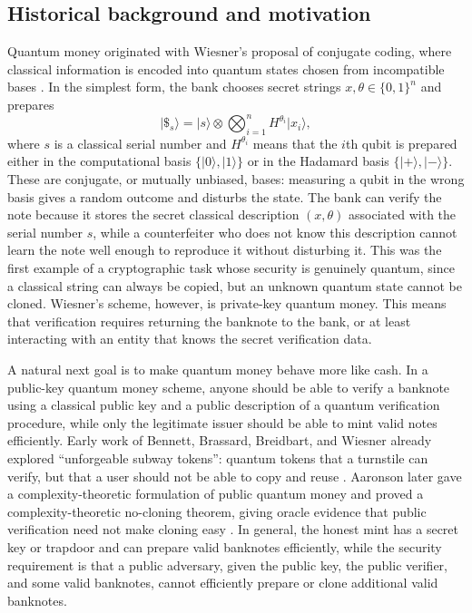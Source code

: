 \documentclass[12pt]{article}
\begin{document}
\subsection{Historical background and motivation}
Quantum money originated with Wiesner's proposal of conjugate coding, where classical information is encoded into quantum states chosen from incompatible bases \cite{wiesnerConjugateCoding1983}.
In the simplest form, the bank chooses secret strings $x,\theta \in \{0,1\}^n$ and prepares
\[
|\$_s\rangle = |s\rangle \otimes \bigotimes_{i=1}^n H^{\theta_i}|x_i\rangle,
\]
where $s$ is a classical serial number and $H^{\theta_i}$ means that the $i$th qubit is prepared either in the computational basis $\{|0\rangle,|1\rangle\}$ or in the Hadamard basis $\{|+\rangle,|-\rangle\}$.
These are conjugate, or mutually unbiased, bases: measuring a qubit in the wrong basis gives a random outcome and disturbs the state.
The bank can verify the note because it stores the secret classical description $(x,\theta)$ associated with the serial number $s$, while a counterfeiter who does not know this description cannot learn the note well enough to reproduce it without disturbing it.
This was the first example of a cryptographic task whose security is genuinely quantum, since a classical string can always be copied, but an unknown quantum state cannot be cloned.
Wiesner's scheme, however, is private-key quantum money.
This means that verification requires returning the banknote to the bank, or at least interacting with an entity that knows the secret verification data.

A natural next goal is to make quantum money behave more like cash.
In a public-key quantum money scheme, anyone should be able to verify a banknote using a classical public key and a public description of a quantum verification procedure, while only the legitimate issuer should be able to mint valid notes efficiently.
Early work of Bennett, Brassard, Breidbart, and Wiesner already explored ``unforgeable subway tokens'': quantum tokens that a turnstile can verify, but that a user should not be able to copy and reuse \cite{bennettQuantumCryptographyUnforgeable1982}.
Aaronson later gave a complexity-theoretic formulation of public quantum money and proved a complexity-theoretic no-cloning theorem, giving oracle evidence that public verification need not make cloning easy \cite{aaronsonQuantumCopyProtectionQuantum2009}.
In general, the honest mint has a secret key or trapdoor and can prepare valid banknotes efficiently, while the security requirement is that a public adversary, given the public key, the public verifier, and some valid banknotes, cannot efficiently prepare or clone additional valid banknotes.
\end{document}
